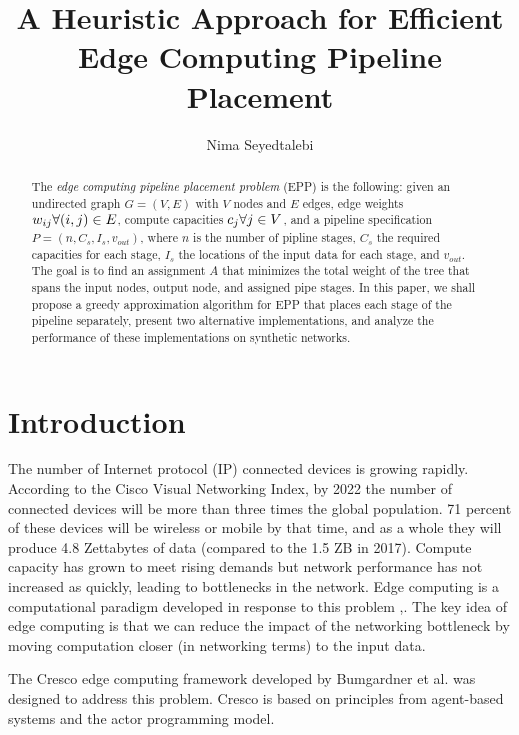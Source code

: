 \documentclass{article}
\author{Nima Seyedtalebi}
\title{A Heuristic Approach for Efficient Edge Computing Pipeline Placement}
\newcommand{\forallv}[1]{\ensuremath{\forall #1 \in V}}
\newcommand{\foralle}[2]{\ensuremath{\forall (#1,#2) \in E }}
\begin{document}
	\maketitle
	\begin{abstract}
		The \textit{edge computing pipeline placement problem} (EPP) is the following: given an undirected graph $G=(V,E)$ with $V$ nodes and $E$ edges, edge weights $w_{ij} \space \foralle{i}{j}$, compute capacities $c_{j} \space \forallv{j}$, and a pipeline specification $P = (n,C_{s},I_{s},v_{out})$, where  $n$ is the number of pipline stages, $C_{s}$ the required capacities for each stage, $I_{s}$ the locations of the input data for each stage, and $v_{out}$. The goal is to find an assignment $A$ that minimizes the total weight of the tree that spans the input nodes, output node, and assigned pipe stages. In this paper, we shall propose a greedy approximation algorithm for EPP that places each stage of the pipeline separately, present two alternative implementations, and analyze the performance of these implementations on synthetic networks.
	\end{abstract}
	
	\section{Introduction}
	The number of Internet protocol (IP) connected devices is growing rapidly. According to the Cisco Visual Networking Index, by 2022 the number of connected devices will be more than three times the global population. 71 percent of these devices will be wireless or mobile by that time, and as a whole they will produce 4.8 Zettabytes of data (compared to the 1.5 ZB in 2017).\cite{ciscoVNI} Compute capacity has grown to meet rising demands but network performance has not increased as quickly, leading to bottlenecks in the network. Edge computing is a computational paradigm developed in response to this problem \cite{edgeEmerge},\cite{edgePromise}. The key idea of edge computing is that we can reduce the impact of the networking bottleneck by moving computation closer (in networking terms) to the input data.
	
	The Cresco edge computing framework developed by Bumgardner et al.\cite{bumgardner2016cresco} was designed to address this problem. Cresco is based on principles from agent-based systems and the actor programming model. 
	
	
	
\end{document}
